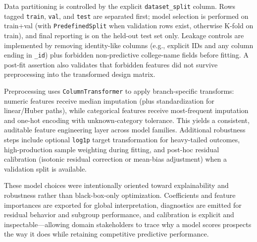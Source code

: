 Data partitioning is controlled by the explicit \texttt{dataset\_split} column. Rows tagged \texttt{train}, \texttt{val}, and \texttt{test} are separated first; model selection is performed on train+val (with \texttt{PredefinedSplit} when validation rows exist, otherwise K-fold on train), and final reporting is on the held-out test set only. Leakage controls are implemented by removing identity-like columns (e.g., explicit IDs and any column ending in \texttt{\_id}) plus forbidden non-predictive college-name fields before fitting. A post-fit assertion also validates that forbidden features did not survive preprocessing into the transformed design matrix.

Preprocessing uses \texttt{ColumnTransformer} to apply branch-specific transforms: numeric features receive median imputation (plus standardization for linear/Huber paths), while categorical features receive most-frequent imputation and one-hot encoding with unknown-category tolerance. This yields a consistent, auditable feature engineering layer across model families. Additional robustness steps include optional \texttt{log1p} target transformation for heavy-tailed outcomes, high-production sample weighting during fitting, and post-hoc residual calibration (isotonic residual correction or mean-bias adjustment) when a validation split is available.

These model choices were intentionally oriented toward explainability and robustness rather than black-box-only optimization. Coefficients and feature importances are exported for global interpretation, diagnostics are emitted for residual behavior and subgroup performance, and calibration is explicit and inspectable---allowing domain stakeholders to trace why a model scores prospects the way it does while retaining competitive predictive performance.
